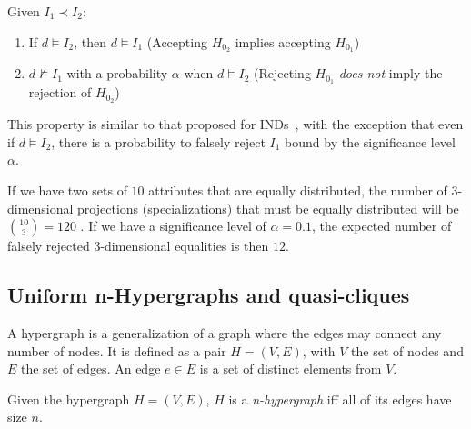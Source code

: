 \begin{property}
    Given $I_1 \prec I_2$:
    
    \label{prop:prob_spec}
    \begin{enumerate}
        \item If $d \models I_2$, then $d \models I_1$ (Accepting $H_{0_2}$ implies accepting $H_{0_1}$\footnotemark)
        \item $d \not\models I_1$ with a probability $\alpha$ when $d \models I_2$
            (Rejecting $H_{0_1}$ \emph{does not} imply the rejection of $H_{0_2}$)
    \end{enumerate}
\end{property}


This property is similar to that proposed for \glspl{IND}~\cite{DeMarchi2002}, with the exception that even if $d \models I_2$, there is a probability to falsely reject $I_1$ bound by the significance level $\alpha$.


\begin{example}
    If we have two sets of $10$ attributes that are equally distributed, the number of
    3-dimensional projections (specializations) that must be equally distributed will be $\binom{10}{3} = 120$ .
    If we have a significance level of $\alpha = 0.1$, the expected number of
    falsely rejected 3-dimensional equalities is then $12$.
\end{example}

\subsection{Uniform n-Hypergraphs and quasi-cliques}

A hypergraph is a generalization of a graph where the edges may connect any number
of nodes.
It is defined as a pair $H = (V, E)$, with $V$ the set of nodes and $E$ the set of edges. An edge $e \in E$ is a set of distinct elements from $V$.

\begin{definition}
    \label{def:khypergraph}    
    Given the hypergraph $H = (V, E)$, $H$ is a \emph{n-hypergraph} iff
    all of its edges have size $n$.
\end{definition}

